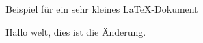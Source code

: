 \documentclass{article}
\begin{document}
Beispiel f\"ur ein sehr \tiny{kleines} \normalsize \LaTeX-Dokument

Hallo welt, dies ist die Änderung.
\end{document}
